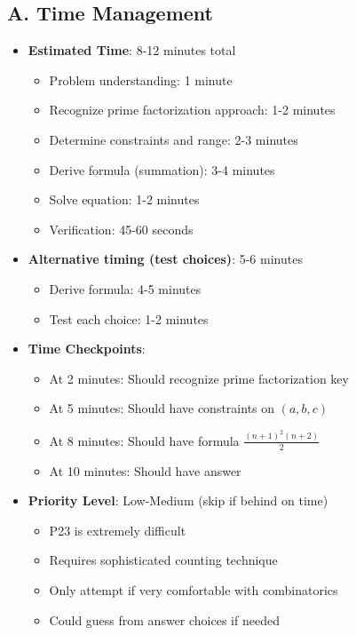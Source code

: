 \documentclass[12pt]{article}
\begin{document}
\begin{competitionbox}
\subsection*{A. Time Management}
\begin{itemize}[leftmargin=*]
    \item \textbf{Estimated Time}: 8-12 minutes total
    \begin{itemize}
        \item Problem understanding: 1 minute
        \item Recognize prime factorization approach: 1-2 minutes
        \item Determine constraints and range: 2-3 minutes
        \item Derive formula (summation): 3-4 minutes
        \item Solve equation: 1-2 minutes
        \item Verification: 45-60 seconds
    \end{itemize}
    \item \textbf{Alternative timing (test choices)}: 5-6 minutes
    \begin{itemize}
        \item Derive formula: 4-5 minutes
        \item Test each choice: 1-2 minutes
    \end{itemize}
    \item \textbf{Time Checkpoints}: 
    \begin{itemize}
        \item At 2 minutes: Should recognize prime factorization key
        \item At 5 minutes: Should have constraints on $(a,b,c)$
        \item At 8 minutes: Should have formula $\frac{(n+1)^2(n+2)}{2}$
        \item At 10 minutes: Should have answer
    \end{itemize}
    \item \textbf{Priority Level}: Low-Medium (skip if behind on time)
    \begin{itemize}
        \item P23 is extremely difficult
        \item Requires sophisticated counting technique
        \item Only attempt if very comfortable with combinatorics
        \item Could guess from answer choices if needed
    \end{itemize}
\end{itemize}


\end{competitionbox}
\end{document}

